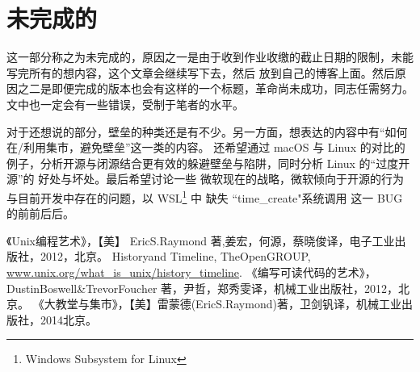     \section{未完成的}
    这一部分称之为未完成的，原因之一是由于收到作业收缴的截止日期的限制，未能写完所有的想内容，这个文章会继续写下去，然后
    放到自己的博客上面。然后原因之二是即便完成的版本也会有这样的一个标题，革命尚未成功，同志任需努力。
    文中也一定会有一些错误，受制于笔者的水平。
    
    对于还想说的部分，壁垒的种类还是有不少。另一方面，想表达的内容中有“如何在/利用集市，避免壁垒”这一类的内容。
    还希望通过 macOS 与 Linux 的对比的例子，分析开源与闭源结合更有效的躲避壁垒与陷阱，同时分析 Linux 的“过度开源”的
    好处与坏处。最后希望讨论一些 微软现在的战略，微软倾向于开源的行为与目前开发中存在的问题，以 WSL\footnote{Windows Subsystem for Linux} 中 缺失 “time\_create"系统调用 这一 BUG 的前前后后。
    
    
    
    
    

    \begin{thebibliography}{0}
        《Unix编程艺术》，【美】 Eric\space S.\space Raymond 著,姜宏，何源，蔡晓俊\space 译，电子工业出版社，2012，北京。
         History\space and \space Timeline, The\space Open\space GROUP,
          \href{http://www.unix.org/what_is_unix/history_timeline.html}{www.unix.org/what\_is\_unix/history\_timeline}.
         《编写可读代码的艺术》，Dustin\space Boswell\&Trevor\space Foucher 著，尹哲，郑秀雯\space 译，机械工业出版社，2012，北京。
         《大教堂与集市》，【美】雷蒙德(Eric\space S.\space Raymond)著，卫剑钒\space 译，机械工业出版社，2014北京。
    \end{thebibliography}
        